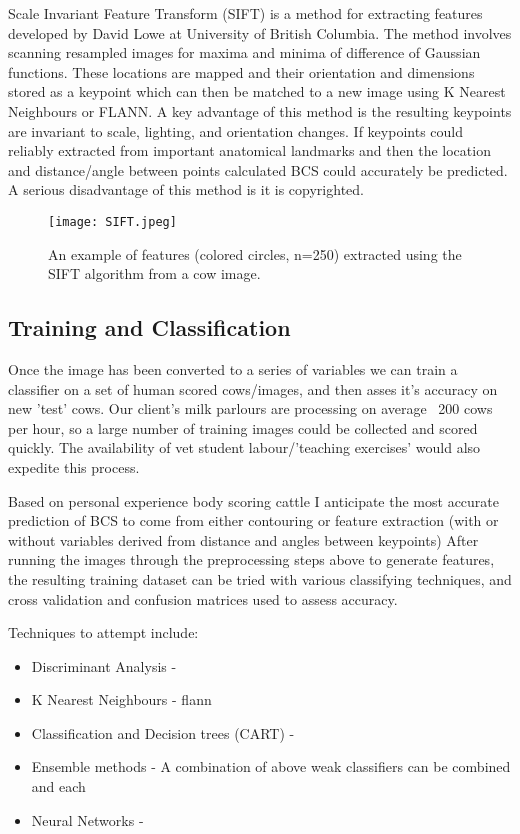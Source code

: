 \documentclass[11pt]{article}
\begin{document}
	
	Scale Invariant Feature Transform (SIFT) is a method for extracting features developed by David Lowe at University of British Columbia\cite{Lowe2004a}.
	The method involves scanning resampled images for maxima and minima of difference of Gaussian functions.
	These locations are mapped and their orientation and dimensions stored as a keypoint which can then be matched to a new image using K Nearest Neighbours or FLANN. 
	A key advantage of this method is the resulting keypoints are invariant to scale, lighting, and orientation changes.
	If keypoints could reliably extracted from important anatomical landmarks and then the location and distance/angle between points calculated BCS could accurately be predicted.
	A serious disadvantage of this method is it is copyrighted.

	\begin{figure}[b!]
		\centering
		\texttt{[image: SIFT.jpeg]}
		\caption{An example of features (colored circles, n=250) extracted  using the SIFT algorithm from a cow image.}
	\end{figure}


\subsection{Training and Classification}
	Once the image has been converted to a series of variables we can train a classifier on a set of human scored cows/images, and then asses it's accuracy on new 'test' cows.
	Our client's milk parlours are processing on average ~200 cows per hour, so a large number of training images could be collected and scored quickly. 
	The availability of vet student labour/'teaching exercises' would also expedite this process.


	Based on personal experience body scoring cattle I anticipate the most accurate prediction of BCS to come from either contouring or feature extraction (with or without variables derived from distance and angles between keypoints)
	After running the images through the preprocessing steps above to generate features, the resulting training dataset can be tried with various classifying techniques, and cross validation and confusion matrices used to assess accuracy.


	Techniques to attempt include: 

	\begin{itemize}
		\item Discriminant Analysis - 
		\item K Nearest Neighbours - flann
		\item Classification and Decision trees (CART) - 
		\item Ensemble methods - A combination of above weak classifiers can be combined and each 
		\item Neural Networks - 
	\end{itemize}
\end{document}
